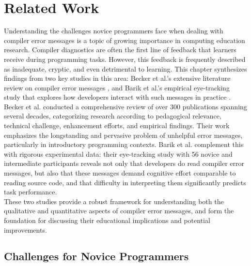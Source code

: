 \chapter{Related Work} %

Understanding the challenges novice programmers face when dealing with compiler error messages is a topic of growing importance in computing education research.
Compiler diagnostics are often the first line of feedback that learners receive during programming tasks.
However, this feedback is frequently described as inadequate, cryptic, and even detrimental to learning.
This chapter synthesizes findings from two key studies in this area:
Becker et al.'s extensive literature review on compiler error messages \cite{becker},
and Barik et al.'s empirical eye-tracking study that explores how developers interact with such messages in practice \cite{barik}.\\[5pt]
\noindent Becker et al. \cite{becker} conducted a comprehensive review of over 300 publications spanning several decades,
categorizing research according to pedagogical relevance, technical challenge, enhancement efforts, and empirical findings.
Their work emphasizes the longstanding and pervasive problem of unhelpful error messages, particularly in introductory programming contexts.
Barik et al. \cite{barik} complement this with rigorous experimental data:
their eye-tracking study with 56 novice and intermediate participants reveals not only that developers do read compiler error messages,
but also that these messages demand cognitive effort comparable to reading source code, and that difficulty in interpreting them significantly predicts task performance.\\[5pt]
\noindent These two studies provide a robust framework for understanding both the qualitative and quantitative aspects of compiler error messages,
and form the foundation for discussing their educational implications and potential improvements.

\section{Challenges for Novice Programmers} %


